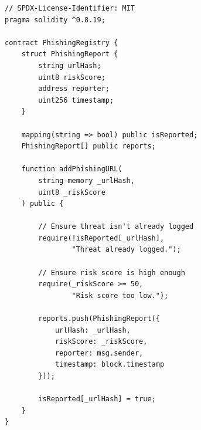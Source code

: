 \begin{lstlisting}[caption={Smart Contract Logging Mechanism}, label={code:smart_contract}]
// SPDX-License-Identifier: MIT
pragma solidity ^0.8.19;

contract PhishingRegistry {
    struct PhishingReport {
        string urlHash;
        uint8 riskScore;
        address reporter;
        uint256 timestamp;
    }

    mapping(string => bool) public isReported;
    PhishingReport[] public reports;

    function addPhishingURL(
        string memory _urlHash, 
        uint8 _riskScore
    ) public {
        
        // Ensure threat isn't already logged
        require(!isReported[_urlHash], 
                "Threat already logged.");
                
        // Ensure risk score is high enough
        require(_riskScore >= 50, 
                "Risk score too low.");

        reports.push(PhishingReport({
            urlHash: _urlHash,
            riskScore: _riskScore,
            reporter: msg.sender,
            timestamp: block.timestamp
        }));
        
        isReported[_urlHash] = true;
    }
}
\end{lstlisting}